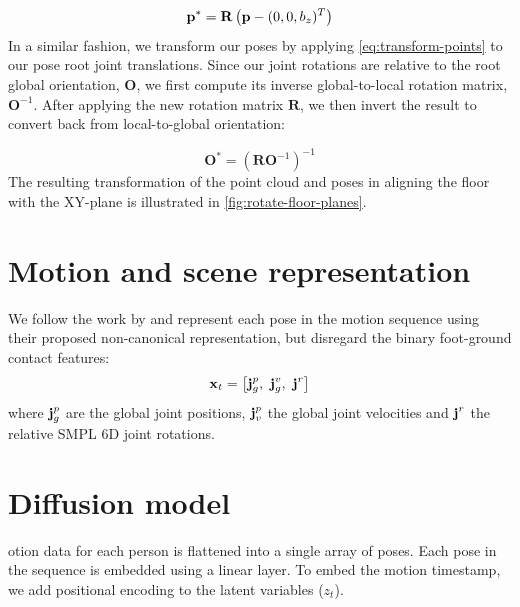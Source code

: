 \begin{equation} \label{eq:transform-points}
    \boldsymbol{\mathbf{p}}^* = \mathbf{R} \left(\boldsymbol{\mathbf{p}} - (0, 0, b_z)^T \right) 
\end{equation}
In a similar fashion, we transform our poses by applying \cref{eq:transform-points} to our pose root joint translations. Since our joint rotations are relative to the root global orientation, $\mathbf{O}$, we first compute its inverse global-to-local rotation matrix, $\mathbf{O}^{-1}$. After applying the new rotation matrix $\mathbf{R}$, we then invert the result to convert back from local-to-global orientation:

\begin{equation}
    \mathbf{O}^* = \left(\mathbf{R} \mathbf{O}^{-1} \right)^{-1}
\end{equation}
The resulting transformation of the point cloud and poses in aligning the floor with the XY-plane is illustrated in \cref{fig:rotate-floor-planes}.

\section{Motion and scene representation}


We follow the work by \cite{liang2024intergen} and represent each pose in the motion sequence using their proposed non-canonical representation, but disregard the binary foot-ground contact features:
\begin{equation}
    \vect{x}_t = \left[\vect{j}_g^p,\ \vect{j}_g^v,\ \vect{j}^r \right]
\end{equation}
where $\boldsymbol{\mathbf{j}}_g^p$ are the global joint positions, $\boldsymbol{\mathbf{j}}_v^p$ the global joint velocities and $\boldsymbol{\mathbf{j}}^r$ the relative SMPL 6D joint rotations.






\section{Diffusion model}


otion data for each person is flattened into a single array of poses. Each pose in the sequence is embedded using a linear layer. To embed the motion timestamp, we add positional encoding to the latent variables ($z_t$).

